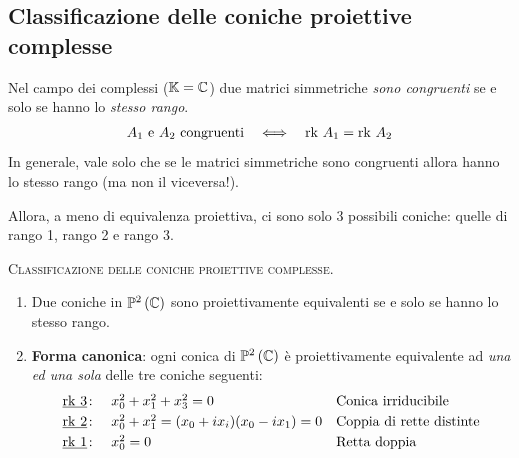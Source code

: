\subsection{Classificazione delle coniche proiettive complesse}
\begin{remember}
Nel campo dei complessi ($\mathbb{K}=\mathbb{C}$) due matrici simmetriche \textit{sono congruenti} se e solo se hanno lo \textit{stesso rango}.
\begin{equation*}
	\begin{array}{ccc}
		A_1\text{ e }A_2\text{ congruenti}& \iff & \mathrm{rk}\  A_1=\mathrm{rk}\  A_2
	\end{array}
\end{equation*}
In generale, vale solo che se le matrici simmetriche sono congruenti allora hanno lo stesso rango (ma non il viceversa!).
\end{remember}
Allora, a meno di equivalenza proiettiva, ci sono solo 3 possibili coniche: quelle di rango 1, rango 2 e rango 3.
\begin{theorema}\textsc{Classificazione delle coniche proiettive complesse}.
\begin{enumerate}
\item	Due coniche in $\proj[2]{\complexset}$ sono proiettivamente equivalenti se e solo se hanno lo stesso rango.
\item	\textbf{Forma canonica}: ogni conica di $\proj[2]{\complexset}$ è proiettivamente equivalente ad \textit{una ed una sola} delle tre coniche seguenti:\\
\begin{equation*}
		\begin{array}{cll}
		\underline{\mathrm{rk}\  3}\colon & x_0^2+x_1^2+x_3^2=0 &	\text{Conica irriducibile}\\[1mm]
		\underline{\mathrm{rk}\  2} \colon & x_0^2+x_1^2=(x_0+ix_i)(x_0-ix_1)=0 & \text{Coppia di rette distinte}\\[1mm]
		\underline{\mathrm{rk}\  1} \colon & x_0^2=0 & \text{Retta doppia}
	\end{array}
\end{equation*}
\end{enumerate}
\vspace{-3mm}
\end{theorema}



